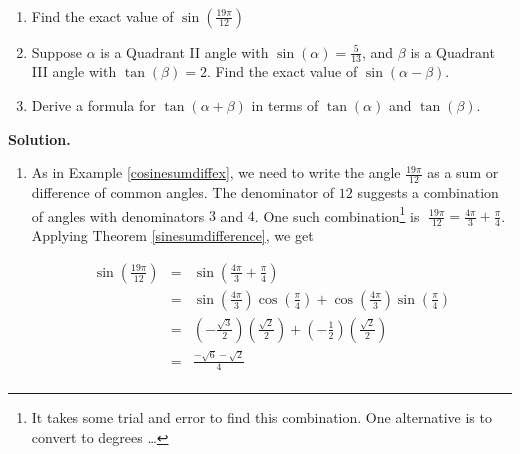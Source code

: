 \documentclass{ximera}
\begin{document}
\begin{example} $~$  \label{sinesumanddiffex}

\begin{enumerate}

\item  Find the exact value of $\sin\left(\frac{19 \pi}{12}\right)$

\item  Suppose $\alpha$ is a Quadrant II angle with $\sin(\alpha) = \frac{5}{13}$, and $\beta$ is a Quadrant III angle with $\tan(\beta) = 2$. Find the exact value of $\sin(\alpha - \beta)$.

\item  Derive a formula for $\tan(\alpha + \beta)$ in terms of $\tan(\alpha)$ and $\tan(\beta)$.

\end{enumerate}

{\bf Solution.}  

\begin{enumerate}

\item  As in  Example \ref{cosinesumdiffex}, we need to write the angle $\frac{19 \pi}{12}$ as a sum or difference of common angles.  The denominator of $12$ suggests a combination of angles with denominators $3$ and $4$.  One such combination\footnote{It takes some trial and error  to find this combination.  One alternative is to convert to degrees \ldots} is $\; \frac{19 \pi}{12} = \frac{4 \pi}{3} + \frac{\pi}{4}$.  Applying Theorem \ref{sinesumdifference}, we get

\vspace{-.15in}

\[ \begin{array}{rcl}

\sin\left( \frac{19 \pi}{12}\right) & = & \sin\left( \frac{4 \pi}{3} +  \frac{\pi}{4} \right) \\  
                            & = & \sin\left( \frac{4 \pi}{3} \right)\cos\left( \frac{\pi}{4} \right) + \cos\left( \frac{4 \pi}{3} \right)\sin\left( \frac{\pi}{4} \right) \\  
                            & = & \left( - \frac{\sqrt{3}}{2} \right)\left(  \frac{\sqrt{2}}{2} \right)  +  \left( - \frac{1}{2} \right)\left(  \frac{\sqrt{2}}{2} \right) \\  
														& = &   \frac{-\sqrt{6}- \sqrt{2}}{4} \\
\end{array} \]

\vspace{-.1in}


\end{enumerate}
\end{example}
\end{document}
